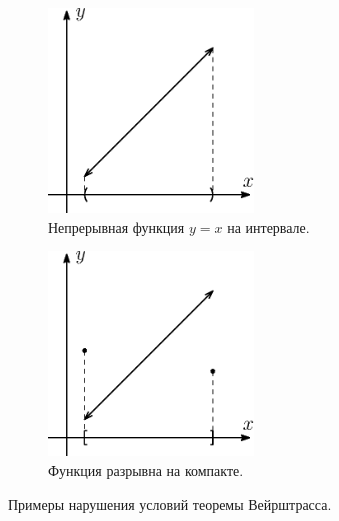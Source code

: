 \documentclass[12pt]{article}
\theoremstyle{definition}
\begin{document}
\begin{figure}[H]
	\begin{subfigure}[b]{0.5\textwidth}
		\centering
		\includegraphics[width=0.6\textwidth]{18_3.eps}
		\caption{Непрерывная функция $y = x$ на интервале.}
		\label{18_3}
	\end{subfigure}%
	\begin{subfigure}[b]{0.5\textwidth}
		\centering
		\includegraphics[width=0.6\textwidth]{18_4.eps}
		\caption{Функция разрывна на компакте.}
		\label{18_4}
	\end{subfigure}
	\caption{Примеры нарушения условий теоремы Вейрштрасса.}
\end{figure}
\end{document}
